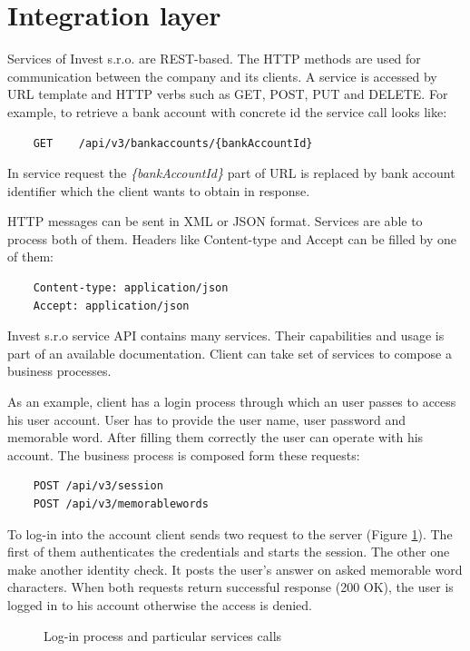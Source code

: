 \section{Integration layer}
Services of Invest s.r.o. are REST-based. The HTTP methods are used for communication between the company and its clients. A service is accessed by URL template and HTTP verbs such as GET, POST, PUT and DELETE. For example, to retrieve a bank account with concrete id the service call looks like: 

\begin{lstlisting}
    GET    /api/v3/bankaccounts/{bankAccountId}
\end{lstlisting}

In service request the \emph{\{bankAccountId\}} part of URL is replaced by bank account identifier which the client wants to obtain in response.

HTTP messages can be sent in XML or JSON format. Services are able to process both of them. Headers like Content-type and Accept can be filled by one of them:
 
\begin{lstlisting}
    Content-type: application/json
    Accept: application/json
\end{lstlisting}

Invest s.r.o service API contains many services. Their capabilities and usage is part of an available \gls{documentation}. Client can take set of services to compose a business processes. 

As an example, client has a login process through which an user passes to access his user account. User has to provide the user name, user password and memorable word. After filling them correctly the user can operate with his account. The business process is composed form these requests:

\begin{lstlisting}
    POST /api/v3/session
    POST /api/v3/memorablewords
\end{lstlisting}
  
To log-in into the account client sends two request to the server (Figure \ref{fig:login-process}). The first of them authenticates the credentials and starts the \gls{session}. The other one make another identity check. It posts the user's answer on asked memorable word characters. When both requests return successful response (200 OK), the user is logged in to his account otherwise the access is denied.

\begin{figure}[htp] 
\caption{Log-in process and particular services calls}
\label{fig:login-process}
\end{figure} 


